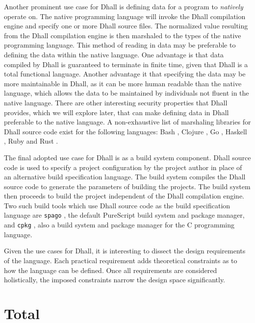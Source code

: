 \documentclass[12pt]{diazessay}
\begin{document}
Another prominent use case for Dhall is defining data for a program to \emph{natively} operate on.
The native programming language will invoke the Dhall compilation engine and specify one or more Dhall source files.
The normalized value resulting from the Dhall compilation engine is then marshaled to the types of the native programming language.
This method of reading in data may be preferable to defining the data within the native language.
One advantage is that data compiled by Dhall is guaranteed to terminate in finite time, given that Dhall is a total functional language.
Another advantage it that specifying the data may be more maintainable in Dhall, as it can be more human readable than the native language, which allows the data to be maintained by individuals not fluent in the native language.
There are other interesting security properties that Dhall provides, which we will explore later, that can make defining data in Dhall preferable to the native language.
A non-exhaustive list of marshaling libraries for Dhall source code exist for the following languages: Bash \cite{DhallBash}, Clojure \cite{DhallClojure}, Go \cite{DhallGo}, Haskell \cite{DhallHaskell}, Ruby \cite{DhallRuby} and Rust \cite{DhallRust}.

The final adopted use case for Dhall is as a build system component.
Dhall source code is used to specify a project configuration by the project author in place of an alternative build specification language.
The build system compiles the Dhall source code to generate the parameters of building the projects.
The build system then proceeds to build the project independent of the Dhall compilation engine.
Two such build tools which use Dhall source code as the build specification language are \texttt{spago} \cite{Spago}, the default PureScript build system and package manager, and \texttt{cpkg} \cite{cpkg}, also a build system and package manager for the C programming language.

Given the use cases for Dhall, it is interesting to dissect the design requirements of the language.
Each practical requirement adds theoretical constraints as to how the language can be defined.
Once all requirements are considered holistically, the imposed constraints narrow the design space significantly.

\section*{Total}
\end{document}
